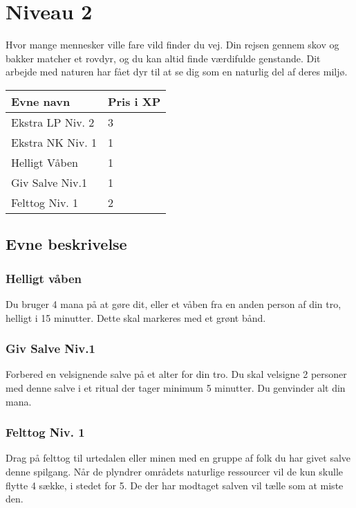 \chapter{Niveau 2}

Hvor mange mennesker ville fare vild finder du vej. Din rejsen gennem skov og bakker matcher et rovdyr, og du kan altid finde værdifulde genstande. Dit arbejde med naturen har fået dyr til at se dig som en naturlig del af deres miljø.

\begin{table}[H]
    \centering
    \begin{tabular}{|p{}|p{}|}
    \rowcolor{cerulean!80}\hline
    Evne navn & Pris i XP \\\hline
        Ekstra LP Niv. 2& 3\\\hline
        Ekstra NK Niv. 1& 1\\\hline
        Helligt Våben & 1\\\hline
        Giv Salve Niv.1 & 1\\\hline
        Felttog Niv. 1& 2\\\hline
    \end{tabular}
\end{table}
\section{Evne beskrivelse}



\subsection{Helligt våben}
Du bruger 4 mana på at gøre dit, eller et våben fra en anden person af din tro, helligt i 15 minutter. Dette skal markeres med et grønt bånd.

\subsection{Giv Salve Niv.1}
Forbered en velsignende salve på et alter for din tro. Du skal velsigne 2 personer med denne salve i et ritual der tager minimum 5 minutter. Du genvinder alt din mana.

\subsection{Felttog Niv. 1}
Drag på felttog til urtedalen eller minen med en gruppe af folk du har givet salve denne spilgang. Når de plyndrer områdets naturlige ressourcer vil de kun skulle flytte 4 sække, i stedet for 5. De der har modtaget salven vil tælle som at miste den.
